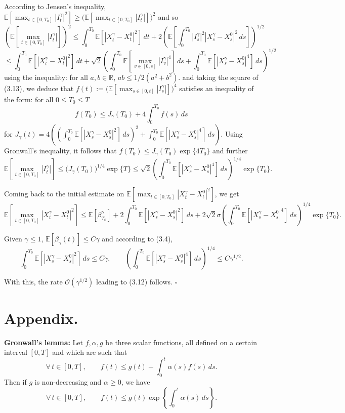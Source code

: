 \documentclass[11pt]{article}
\theoremstyle{remark}
\begin{document}
According to Jensen's inequality, $\mathbb{E}[\max_{t\in[0,T_0]}|I_t^\gamma|^2]\ge \bigl(\mathbb{E}[\max_{t\in[0,T_0]}|I_t^\gamma|]\bigr)^2$ and so
\[
\left(\mathbb{E}\!\left[\max_{t\in[0,T_0]}|I_t^\gamma|\right]\right)^2
\le \int_0^{T_0}\mathbb{E}\!\left[|X_t^\gamma-X_t^0|^2\right]\,dt
+2\left(\mathbb{E}\!\left[\int_0^{T_0}|I_s^\gamma|^2|X_s^\gamma-X_s^0|^2\,ds\right]\right)^{1/2}
\]
\[
\le \int_0^{T_0}\mathbb{E}\!\left[|X_t^\gamma-X_t^0|^2\right]\,dt
+\sqrt{2}\left(\int_0^{T_0}\mathbb{E}\!\left[\max_{v\in[0,s]}|I_v^\gamma|^4\right]\,ds
+\int_0^{T_0}\mathbb{E}\!\left[|X_s^\gamma-X_s^0|^4\right]\,ds\right)^{1/2}
\]
using the inequality: for all $a,b\in\mathbb{R}$, $ab\le 1/2(a^2+b^2)$. and taking the square of (3.13), we deduce that
$f(t):=\bigl(\mathbb{E}[\max_{s\in[0,t]}|I_s^\gamma|]\bigr)^4$ satisfies an inequality of the form: for all $0\le T_0\le T$
\[
f(T_0)\le J_\gamma(T_0)+4\int_0^{T_0}f(s)\,ds
\]
for $J_\gamma(t)=4\left(\left(\int_0^{T_0}\mathbb{E}\!\left[|X_s^\gamma-X_s^0|^2\right]\,ds\right)^2+\int_0^{T_0}\mathbb{E}\!\left[|X_s^\gamma-X_s^0|^4\right]\,ds\right)$. Using Gronwall's inequality, it follows
that $f(T_0)\le J_\gamma(T_0)\exp\{4T_0\}$ and further
\[
\mathbb{E}\!\left[\max_{t\in[0,T_0]}|I_t^\gamma|\right]
\le \bigl(J_\gamma(T_0)\bigr)^{1/4}\exp\{T\}
\le \sqrt{2}\left(\int_0^{T_0}\mathbb{E}\!\left[|X_s^\gamma-X_s^0|^4\right]\,ds\right)^{1/4}\exp\{T_0\}.
\]

Coming back to the initial estimate on $\mathbb{E}[\max_{t\in[0,T_0]}|X_t^\gamma-X_t^0|^2]$, we get
\[
\mathbb{E}\!\left[\max_{t\in[0,T_0]}|X_t^\gamma-X_t^0|^2\right]
\le \mathbb{E}\!\left[\beta_{T_0}^\gamma\right]
+2\int_0^{T_0}\mathbb{E}\!\left[|X_s^\gamma-X_s^0|^2\right]\,ds
+2\sqrt{2}\sigma\left(\int_0^{T_0}\mathbb{E}\!\left[|X_s^\gamma-X_s^0|^4\right]\,ds\right)^{1/4}\exp\{T_0\}.
\]

Given $\gamma\le1$, $\mathbb{E}[\beta_\gamma(t)]\le C\gamma$ and according to (3.4),
\[
\int_0^{T_0}\mathbb{E}\!\left[|X_s^\gamma-X_s^0|^2\right]\,ds\le C\gamma,\qquad
\left(\int_0^{T_0}\mathbb{E}\!\left[|X_s^\gamma-X_s^0|^4\right]\,ds\right)^{1/4}\le C\gamma^{1/2}.
\]

With this, the rate $\mathcal{O}(\gamma^{1/2})$ leading to (3.12) follows. \hfill $\square$


\section{Appendix.}

\noindent\textbf{Gronwall's lemma:}
Let $f,\alpha,g$ be three scalar functions, all defined on a certain interval $[0,T]$ and which are such that
\[
\forall\, t\in[0,T], \qquad f(t)\le g(t)+\int_0^t \alpha(s)f(s)\,ds.
\]
Then if $g$ is non-decreasing and $\alpha\ge0$, we have
\[
\forall\, t\in[0,T], \qquad f(t)\le g(t)\exp\left\{\int_0^t \alpha(s)\,ds\right\}.
\]
\end{document}
